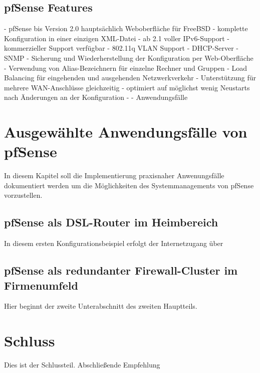 \documentclass[a4paper,12pt]{scrartcl}
\begin{document}
\subsection{pfSense Features}
\cite{vortrag_bsdfirewalling}
- pfSense bis Version 2.0 haupts\"achlich Weboberfl\"ache f\"ur FreeBSD
- komplette Konfiguration in einer einzigen XML-Datei
- ab 2.1 voller IPv6-Support
- kommerzieller Support verf\"ugbar
- 802.11q VLAN Support
- DHCP-Server
- SNMP
- Sicherung und Wiederherstellung der Konfiguration per Web-Oberfl\"ache
- Verwendung von Alias-Bezeichnern f\"ur einzelne Rechner und Gruppen
- Load Balancing f\"ur eingehenden und ausgehenden Netzwerkverkehr
- Unterst\"utzung f\"ur mehrere WAN-Anschl\"usse gleichzeitig
- optimiert auf m\"oglichst wenig Neustarts nach \"Anderungen an der Konfiguration
-
- Anwendungsf\"alle

\clearpage
\section{Ausgew\"ahlte Anwendungsf\"alle von pfSense}
In diesem Kapitel soll die Implementierung praxisnaher Anwenungsf\"alle
dokumentiert werden um die M\"oglichkeiten des Systemmanagements von pfSense
vorzustellen. 

\subsection{pfSense als DSL-Router im Heimbereich}
In diesem ersten Konfigurationsbeispiel erfolgt der Internetzugang \"uber

\subsection{pfSense als redundanter Firewall-Cluster im Firmenumfeld}
Hier beginnt der zweite Unterabschnitt des zweiten Hauptteils.

\clearpage
\section{Schluss}
Dies ist der Schlussteil. Abschlie\ss{}ende Empfehlung

\clearpage
\end{document}
